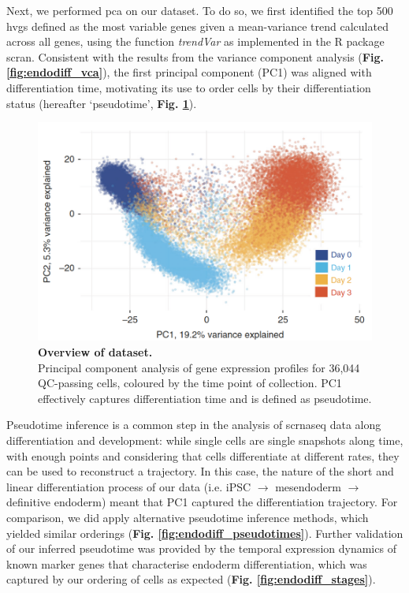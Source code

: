 Next, we performed \gls{pca} on our dataset.
To do so, we first identified the top 500 \gls{hvgs} defined as the most variable genes given a mean-variance trend calculated across all genes, using the function \textit{trendVar} as implemented in the R package scran.
Consistent with the results from the variance component analysis (\textbf{Fig. \ref{fig:endodiff_vca}}), the first principal component (PC1) was aligned with differentiation time, motivating its use to order cells by their differentiation status (hereafter `pseudotime', \textbf{Fig. \ref{fig:endodiff_pca}}).\\

\begin{figure}[h]
\centering
\includegraphics[width=14cm]{Chapter4/Fig/endodiff_pca_overview.png}
\caption[Overview of dataset.]{\textbf{Overview of dataset.}\\
Principal component analysis of gene expression profiles for 36,044 QC-passing
cells, coloured by the time point of collection.
PC1 effectively captures differentiation time and is defined as pseudotime.}
\label{fig:endodiff_pca}
\end{figure}

Pseudotime inference is a common step in the analysis of \gls{scrnaseq} data along differentiation and development: while single cells are single snapshots along time, with enough points and considering that cells differentiate at different rates, they can be used to reconstruct a trajectory.
In this case, the nature of the short and linear differentiation process of our data (i.e. iPSC $\rightarrow$ mesendoderm $\rightarrow$ definitive endoderm) meant that PC1 captured the differentiation trajectory.
For comparison, we did apply alternative pseudotime inference methods, which yielded similar orderings (\textbf{Fig. \ref{fig:endodiff_pseudotimes}}).
Further validation of our inferred pseudotime was provided by the temporal expression dynamics of known marker genes that characterise endoderm differentiation, which was captured by our ordering of cells as expected (\textbf{Fig. \ref{fig:endodiff_stages}}).

